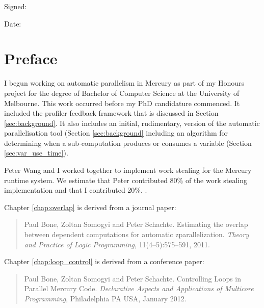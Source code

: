\documentclass[a4paper,twoside]{report}
\begin{document}
\noindent Signed:

\vspace{1em}

\noindent Date:

\chapter*{Preface}

I begun working on automatic parallelism in Mercury as part of my Honours project
for the degree of Bachelor of Computer Science at the University of Melbourne.
This work occurred before my PhD candidature commenced.
It included the profiler feedback framework that is discussed in Section
\ref{sec:background}.
It also includes an initial, rudimentary, version of the automatic
parallelisation tool
(Section \ref{sec:background}
including an algorithm for determining when a sub-computation produces or
consumes a variable (Section \ref{sec:var_use_time}).

Peter Wang and I worked together to implement work stealing for the Mercury
runtime system.
We estimate that Peter contributed 80\% of the work stealing implementation
and that I contributed 20\%.
.

Chapter \ref{chap:overlap} is derived from a journal paper:


\begin{quote}
Paul Bone, Zoltan Somogyi and Peter Schachte.
Estimating the overlap between dependent computations for automatic
zparallelization.
{\em Theory and Practice of Logic Programming}, 11(4--5):575--591, 2011.
\end{quote}


Chapter \ref{chap:loop_control} is derived from a conference paper:

\begin{quote}
Paul Bone, Zoltan Somogyi and Peter Schachte.
Controlling Loops in Parallel Mercury Code.
{\em Declarative Aspects and Applications of Multicore Programming},
Philadelphia PA USA, January 2012.
\end{quote}
\end{document}
